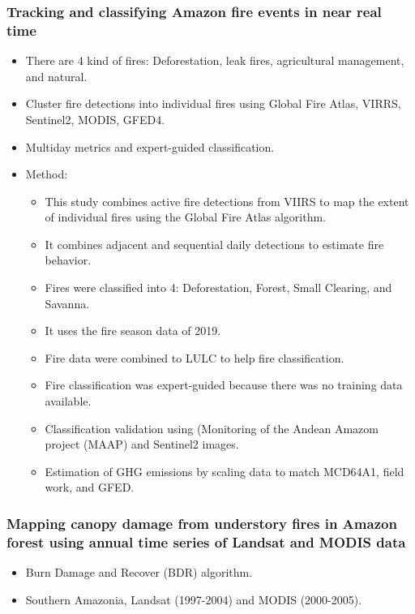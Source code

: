 \documentclass{beamer}
\begin{document}
\begin{frame}[t, allowframebreaks]
    \frametitle{Tracking and classifying Amazon fire events in near real time
    ~\cite{andela2022}}
    \begin{itemize}
        \item There are 4 kind of fires: Deforestation, leak fires, 
            agricultural management, and natural.
        \item Cluster fire detections into individual fires using Global Fire
            Atlas, VIRRS, Sentinel2, MODIS, GFED4.
        \item Multiday metrics and expert-guided classification.
        \item Method:
            \begin{itemize}
            \item This study combines active fire detections from VIIRS to map 
                the extent of individual fires using the Global Fire Atlas 
                    algorithm.
            \item It combines adjacent and sequential daily detections to 
                estimate fire behavior.
            \item Fires were classified into 4: Deforestation, Forest, Small 
                Clearing, and Savanna.
            \item It uses the fire season data of 2019.
            \item Fire data were combined to LULC to help fire classification.
            \item Fire classification was expert-guided because there was no 
                training data available.
            \item Classification validation using (Monitoring of the Andean 
                Amazom project (MAAP) and Sentinel2 images.
            \item Estimation of GHG emissions by scaling data to match MCD64A1, 
                field work, and GFED.
        \end{itemize}
    \end{itemize}
\end{frame}



\begin{frame}[t, allowframebreaks]
    \frametitle{Mapping canopy damage from understory fires in Amazon forest
    using annual time series of Landsat and MODIS data}
    \begin{itemize}
        \item Burn Damage and Recover (BDR) algorithm.
        \item Southern Amazonia, Landsat (1997-2004) and MODIS (2000-2005).
    \end{itemize}
\end{frame}
\end{document}
